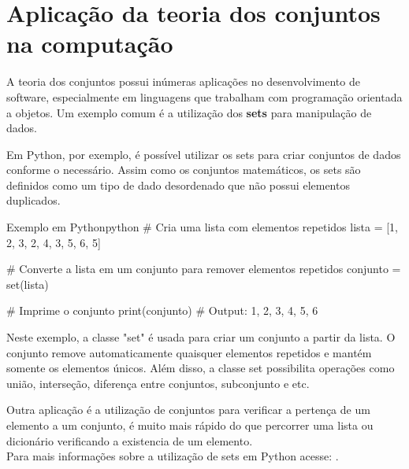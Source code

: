 \section{Aplicação da teoria dos conjuntos na computação}

A teoria dos conjuntos possui inúmeras aplicações no desenvolvimento de software, especialmente em linguagens que trabalham com programação orientada a objetos. Um exemplo comum é a utilização dos \textbf{sets} para manipulação de dados.

Em Python, por exemplo, é possível utilizar os sets para criar conjuntos de dados conforme o necessário. Assim como os conjuntos matemáticos, os sets são definidos como um tipo de dado desordenado que não possui elementos duplicados.\\

\begin{codesnip}{Exemplo em Python}{python}
    # Cria uma lista com elementos repetidos
    lista = [1, 2, 3, 2, 4, 3, 5, 6, 5]

    # Converte a lista em um conjunto para remover elementos repetidos
    conjunto = set(lista)

    # Imprime o conjunto
    print(conjunto)
    # Output: {1, 2, 3, 4, 5, 6}
\end{codesnip}

Neste exemplo, a classe "set" é usada para criar um conjunto a partir da lista. O conjunto remove automaticamente quaisquer elementos repetidos e mantém somente os elementos únicos. Além disso, a classe set possibilita operações como união, interseção, diferença entre conjuntos, subconjunto e etc.

Outra aplicação é a utilização de conjuntos para verificar a pertença de um elemento a um conjunto, é muito mais rápido do que percorrer uma lista ou dicionário verificando a existencia de um elemento.\\

Para mais informações sobre a utilização de sets em Python acesse: . \\




